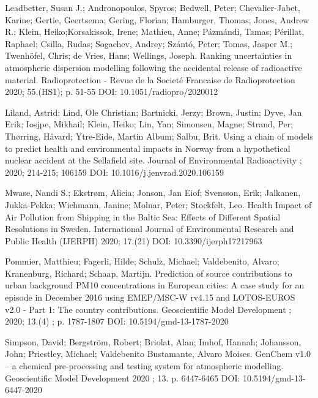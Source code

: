 \begin{list}{}{\setlength{\leftmargin}{15pt}\setlength{\itemindent}{-\leftmargin}}
\item[]
Leadbetter, Susan J.; Andronopoulos, Spyros; Bedwell, Peter; Chevalier-Jabet, Karine; Gertie, Geertsema; Gering, Florian; Hamburger, Thomas; Jones, Andrew R.; Klein, Heiko;Korsakissok, Irene; Mathieu, Anne; Pázmándi, Tamas; Périllat, Raphael; Csilla, Rudas; Sogachev, Andrey; Szántó, Peter; Tomas, Jasper M.; Twenhöfel, Chris; de Vries, Hans; Wellings, Joseph.
Ranking uncertainties in atmospheric dispersion modelling following the accidental release of radioactive material.
Radioprotection - Revue de la Societé Francaise de Radioprotection 2020; 55.(HS1); p. 51-55
DOI: 10.1051/radiopro/2020012 

\item[]
Liland, Astrid; Lind, Ole Christian; Bartnicki, Jerzy; Brown, Justin; Dyve, Jan Erik; Iosjpe, Mikhail; Klein, Heiko; Lin, Yan; Simonsen, Magne; Strand, Per; Thørring, Håvard; Ytre-Eide, Martin Album; Salbu, Brit.
Using a chain of models to predict health and environmental impacts in Norway from a hypothetical nuclear accident at the Sellafield site.
Journal of Environmental Radioactivity ; 2020; 214-215; 106159
DOI: 10.1016/j.jenvrad.2020.106159

\item[]
Mwase, Nandi S.; Ekstrøm, Alicia; Jonson, Jan Eiof; Svensson, Erik; Jalkanen, Jukka-Pekka; Wichmann, Janine; Molnar, Peter; Stockfelt, Leo.
Health Impact of Air Pollution from Shipping in the Baltic Sea: Effects of Different Spatial Resolutions in Sweden.
International Journal of Environmental Research and Public Health (IJERPH) 2020; 17.(21)
DOI: 10.3390/ijerph17217963 

\item[]
Pommier, Matthieu; Fagerli, Hilde; Schulz, Michael; Valdebenito, Alvaro; Kranenburg, Richard; Schaap, Martijn.
Prediction of source contributions to urban background PM10 concentrations in European cities: A case study for an episode in December 2016 using EMEP/MSC-W rv4.15 and LOTOS-EUROS v2.0 - Part 1: The country contributions.
Geoscientific Model Development ; 2020; 13.(4) ; p. 1787-1807
DOI: 10.5194/gmd-13-1787-2020 

\item[]
Simpson, David; Bergström, Robert; Briolat, Alan; Imhof, Hannah; Johansson, John; Priestley, Michael; Valdebenito Bustamante, Alvaro Moises.
GenChem v1.0 – a chemical pre-processing and testing system for atmospheric modelling.
Geoscientific Model Development 2020 ; 13. p. 6447-6465
DOI: 10.5194/gmd-13-6447-2020 


\end{list}
